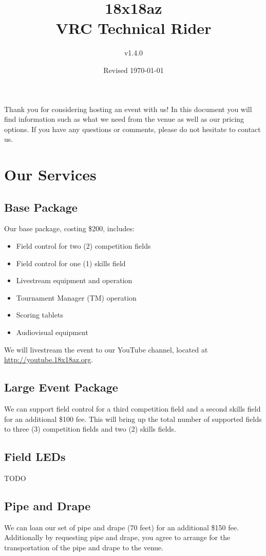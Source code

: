 \documentclass[12pt]{article}
\title{18x18az\\VRC Technical Rider}
\author{v1.4.0}
\date{Revised \today}
\begin{document}
\maketitle
Thank you for considering hosting an event with us!
In this document you will find information such as what we need from the venue as well as our pricing options.
If you have any questions or comments, please do not hesitate to contact us.
\tableofcontents
\pagebreak
\section{Our Services}
\subsection{Base Package}
Our base package, costing \$200, includes:
\begin{itemize}
    \item Field control for two (2) competition fields
    \item Field control for one (1) skills field
    \item Livestream equipment and operation
    \item Tournament Manager (TM) operation
    \item Scoring tablets
    \item Audiovisual equipment
\end{itemize}

\noindent We will livestream the event to our YouTube channel, located at \\\url{http://youtube.18x18az.org}.

\subsection{Large Event Package}
We can support field control for a third competition field and a second skills field for an additional \$100 fee.
This will bring up the total number of supported fields to three (3) competition fields and two (2) skills fields.

\subsection{Field LEDs}
TODO

\subsection{Pipe and Drape}
We can loan our set of pipe and drape (70 feet) for an additional \$150 fee.
Additionally by requesting pipe and drape, you agree to arrange for the transportation of the pipe and drape to the venue.
\end{document}
